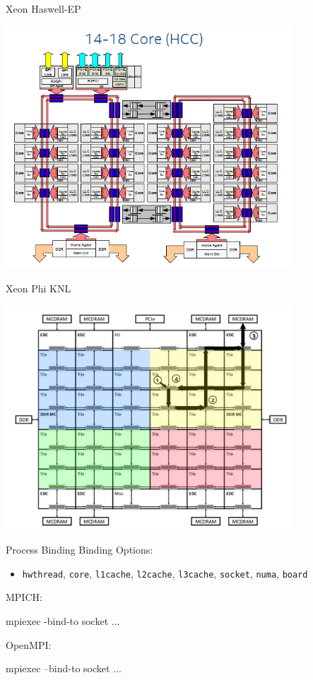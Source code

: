 \documentclass[noamssymb,svgnames]{beamer}
\newcommand{\obj}[1]{\texttt{\color{darkblue}#1}}
\begin{document}
\begin{frame}{Xeon Haswell-EP}
  \begin{center}
    \includegraphics[width=0.8\textwidth]{../images/HaswellEP_DieConfig.png}
  \end{center}
\end{frame}

\begin{frame}{Xeon Phi KNL}
  \begin{center}
    \includegraphics[width=0.8\textwidth]{../images/XeonPhiKNL.png}
  \end{center}
\end{frame}

\begin{frame}[fragile]{Process Binding}
  Binding Options:
  \begin{itemize}
  \item \obj{hwthread}, \obj{core}, \obj{l1cache}, \obj{l2cache}, \obj{l3cache},
    \obj{socket}, \obj{numa}, \obj{board}
  \end{itemize}
  \vfill
  MPICH:
  \begin{shell}[minted options={fontsize=\scriptsize}]
    mpiexec -bind-to socket ...
  \end{shell}
  \vfill
  OpenMPI:
  \begin{shell}
    mpiexec --bind-to socket ...
  \end{shell}
\end{frame}
\end{document}
